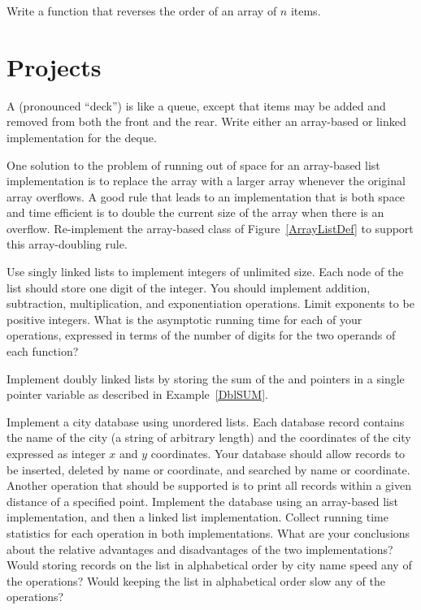 \begin{exercises}
\item
Write a function that reverses the order of an array of \(n\) items.
\end{exercises}

\section{Projects}

\begin{projects}

\item
A  (pronounced ``deck'') is like a queue,
except that items may be added and removed from both the front and the
rear.
Write either an array-based or linked implementation for the deque.

\item
One solution to the problem of running out of space for an array-based
list implementation is to replace the array with a larger array
whenever the original array overflows.
A good rule that leads to an implementation that is both space and
time efficient is to double the current size of the array when there
is an overflow.
Re-implement the array-based  class of
Figure~\ref{ArrayListDef} to support this array-doubling
rule.

\item
Use singly linked lists to implement integers of unlimited size.
Each node of the list should store one digit of the integer.
You should implement addition, subtraction, multiplication, and
exponentiation operations.
Limit exponents to be positive integers.
What is the asymptotic running time for each of your operations,
expressed in terms of the number of digits for the two
operands of each function?

\item
Implement doubly linked lists by storing the sum of the 
 and  pointers in a single pointer variable
as described in Example~\ref{DblSUM}.

\item
\label{CityListEx}
Implement a city database using unordered lists.
Each database record contains the name of the city (a string of
arbitrary length) and the coordinates of the city expressed as integer
$x$ and $y$ coordinates.
Your database should allow records to be inserted, deleted by name or
coordinate, and searched by name or coordinate.
Another operation that should be supported is to print
all records within a given distance of a specified point.
Implement the database using an array-based list implementation, and
then a linked list implementation.
Collect running time statistics for each operation in both implementations.
What are your conclusions about the relative advantages and
disadvantages of the two implementations?
Would storing records on the list in alphabetical order by city name
speed any of the operations?
Would keeping the list in alphabetical order slow any of the
operations?


\end{projects}
